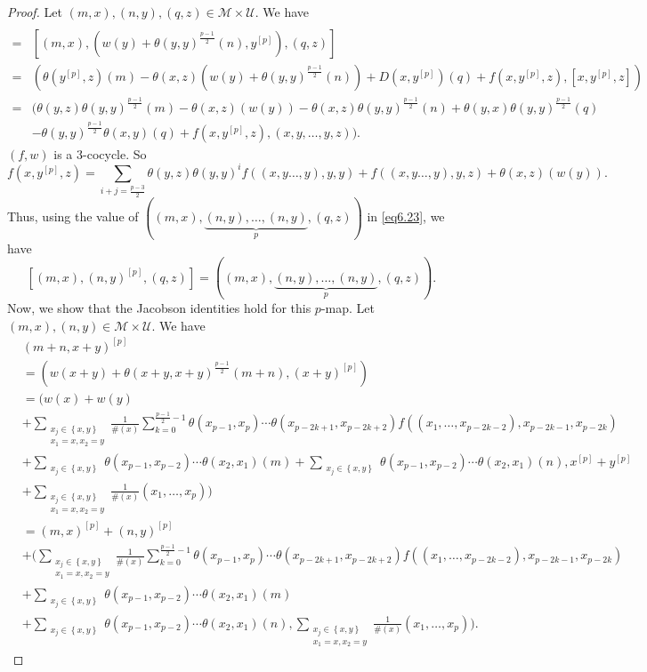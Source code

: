 \documentclass[11pt, twoside]{article}
\begin{document}
\begin{proof}
Let $(m,x),(n,y),(q,z)\in \mathcal{M}\times \mathcal{U}$. We have  \begin{align*}
    [(m,x),&(n,y)^{[p]},(q,z)]\\ =& [(m,x),(w(y)+\theta(y,y)^\frac{p-1}{2}(n),y^{[p]}),(q,z)] \\ =& (\theta(y^{[p]},z)(m)-\theta(x,z)(w(y)+\theta(y,y)^\frac{p-1}{2}(n))+D(x,y^{[p]})(q)+f(x,y^{[p]},z),[x,y^{[p]},z])\\ =& (\theta(y,z)\theta(y,y)^\frac{p-1}{2}(m)-\theta(x,z)(w(y))-\theta(x,z)\theta(y,y)^\frac{p-1}{2}(n)+\theta(y,x)\theta(y,y)^\frac{p-1}{2}(q)\\ &-\theta(y,y)^\frac{p-1}{2}\theta(x,y)(q)+f(x,y^{[p]},z), (x,y,\ldots,y,z)).
\end{align*} $(f,w)$ is a $3$-cocycle. So $$f(x,y^{[p]},z)= \sum\limits_{i+j=\frac{p-3}{2}}\theta(y,z)\theta(y,y)^if((x,y\ldots,y),y,y)+f((x,y\ldots,y),y,z)+\theta(x,z)(w(y)). $$ Thus, using the value of $((m,x),\underbrace{(n,y),\ldots,(n,y)}_p,(q,z))$ in \eqref{eq6.23}, we have
    $$[(m,x),(n,y)^{[p]},(q,z)]=((m,x),\underbrace{(n,y),\ldots,(n,y)}_p,(q,z)).$$ Now, we show that the Jacobson identities hold for this $p$-map. Let $(m,x),(n,y)\in \mathcal{M}\times \mathcal{U} $. We have\begin{align*}
       & (m+n,x+y)^{[p]}\\ &= (w(x+y)+\theta(x+y,x+y)^\frac{p-1}{2}(m+n),(x+y)^{[p]})\\ &= \bigg(w(x)+w(y) \\ & +  \sum_{\substack{x_j\in \left\{x,y \right\}\\x_1=x,x_2=y}}\frac{1}{\#(x)}\sum\limits_{k=0}^{\frac{p-1}{2}-1}\theta(x_{p-1},x_p)\cdots\theta(x_{p-2k+1},x_{p-2k+2}) f((x_1,\ldots,x_{p-2k-2}),x_{p-2k-1},x_{p-2k}) \\ & +  \sum_{\substack{x_j\in \left\{x,y \right\}}}\theta(x_{p-1},x_{p-2})\cdots\theta(x_2,x_1)(m)+  \sum_{\substack{x_j\in \left\{x,y \right\}}}\theta(x_{p-1},x_{p-2})\cdots\theta(x_2,x_1)(n), x^{[p]}+y^{[p]}\\ &+  \sum_{\substack{x_j\in \left\{x,y \right\}\\x_1=x,x_2=y}}\frac{1}{\#(x)}(x_1,\ldots,x_p) \bigg)\\ & = (m,x)^{[p]}+(n,y)^{[p]}\\ & +\bigg( \sum_{\substack{x_j\in \left\{x,y \right\}\\x_1=x,x_2=y}}\frac{1}{\#(x)}\sum\limits_{k=0}^{\frac{p-1}{2}-1}\theta(x_{p-1},x_p)\cdots\theta(x_{p-2k+1},x_{p-2k+2}) f((x_1,\ldots,x_{p-2k-2}),x_{p-2k-1},x_{p-2k})\\ & +  \sum_{\substack{x_j\in \left\{x,y \right\}}}\theta(x_{p-1},x_{p-2})\cdots\theta(x_2,x_1)(m) \\ &+  \sum_{\substack{x_j\in \left\{x,y \right\}}}\theta(x_{p-1},x_{p-2})\cdots\theta(x_2,x_1)(n), \sum_{\substack{x_j\in \left\{x,y \right\}\\x_1=x,x_2=y}}\frac{1}{\#(x)}(x_1,\ldots,x_p) \bigg).
    \end{align*}




\end{proof}
\end{document}
